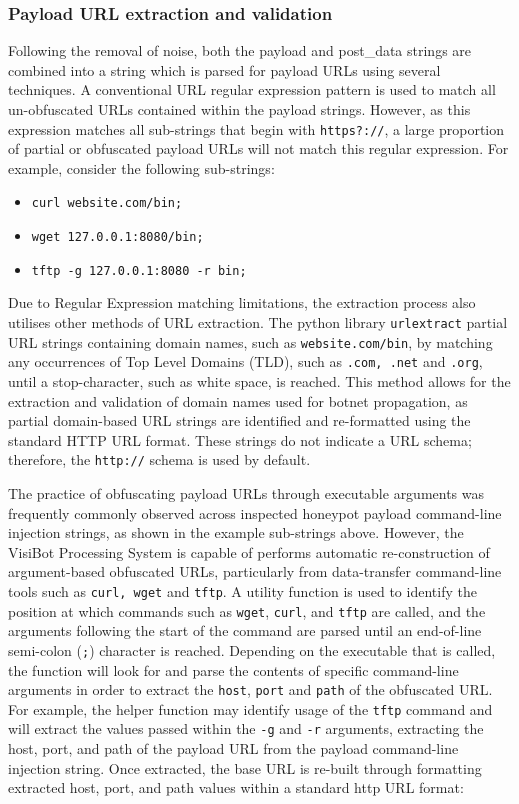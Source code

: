 \subsubsection{Payload URL extraction and validation} 

Following the removal of noise, both the payload and post\_data strings are combined into a string which is parsed for payload URLs using several techniques. A conventional URL regular expression pattern is used to match all un-obfuscated URLs contained within the payload strings. However, as this expression matches all sub-strings that begin with \texttt{https?://}, a large proportion of partial or obfuscated payload URLs will not match this regular expression. For example, consider the following sub-strings:

\begin{itemize}
    \item \texttt{curl website.com/bin;}
    \item \texttt{wget 127.0.0.1:8080/bin;}
    \item \texttt{tftp -g 127.0.0.1:8080 -r bin;}
\end{itemize}

Due to Regular Expression matching limitations, the extraction process also utilises other methods of URL extraction. The python library \texttt{urlextract} \citep{URLExtract} partial URL strings containing domain names, such as \texttt{website.com/bin}, by matching any occurrences of Top Level Domains (TLD), such as \texttt{.com, .net} and \texttt{.org}, until a stop-character, such as white space, is reached. This method allows for the extraction and validation of domain names used for botnet propagation, as partial domain-based URL strings are identified and re-formatted using the standard HTTP URL format. These strings do not indicate a URL schema; therefore, the \texttt{http://} schema is used by default.

The practice of obfuscating payload URLs through executable arguments was frequently commonly observed across inspected honeypot payload command-line injection strings, as shown in the example sub-strings above. However, the VisiBot Processing System is capable of performs automatic re-construction of argument-based obfuscated URLs, particularly from data-transfer command-line tools such as \texttt{curl, wget} and \texttt{tftp}. A utility function is used to identify the position at which commands such as \texttt{wget}, \texttt{curl}, and \texttt{tftp} are called, and the arguments following the start of the command are parsed until an end-of-line semi-colon (\texttt{;}) character is reached. Depending on the executable that is called, the function will look for and parse the contents of specific command-line arguments in order to extract the \texttt{host}, \texttt{port} and \texttt{path} of the obfuscated URL. For example, the helper function may identify usage of the \texttt{tftp} command and will extract the values passed within the \texttt{-g} and \texttt{-r} arguments, extracting the host, port, and path of the payload URL from the payload command-line injection string. Once extracted, the base URL is re-built through formatting extracted host, port, and path values within a standard http URL format: 

